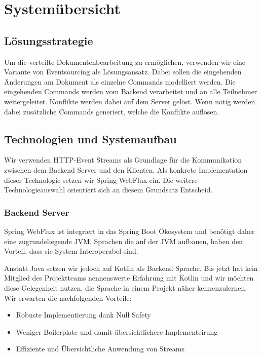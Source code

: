 \section{Systemübersicht}

\subsection{Lösungsstrategie}
Um die verteilte Dokumentenbearbeitung zu ermöglichen, verwenden wir eine Variante von Eventsourcing als Lösungsansatz.
Dabei sollen die eingehenden Änderungen am Dokument als einzelne Commands modelliert werden.
Die eingehenden Commands werden vom Backend verarbeitet und an alle Teilnehmer weitergeleitet.
Konflikte werden dabei auf dem Server gelöst.
Wenn nötig werden dabei zusätzliche Commands generiert, welche die Konflikte auflösen.

\subsection{Technologien und Systemaufbau}

Wir verwenden HTTP-Event Streams als Grundlage für die Kommunikation zwischen dem Backend Server und den Klienten.
Als konkrete Implementation dieser Technologie setzen wir Spring-WebFlux ein.
Die weitere Technologieauswahl orientiert sich an diesem Grundsatz Entscheid.

\subsubsection{Backend Server}
Spring WebFlux ist integriert in das Spring Boot Ökosystem und benötigt daher eine zugrundeliegende JVM\@.
Sprachen die auf der JVM aufbauen, haben den Vorteil, dass sie System Interoperabel sind.

Anstatt Java setzen wir jedoch auf Kotlin als Backend Sprache.
Bis jetzt hat kein Mitglied des Projektteams nennenswerte Erfahrung mit Kotlin und wir möchten diese Gelegenheit nutzen,
die Sprache in einem Projekt näher kennenzulernen.
Wir erwarten die nachfolgenden Vorteile:

\begin{itemize}
    \item Robuste Implementierung dank Null Safety
    \item Weniger Boilerplate und damit übersichtlichere Implementeirung
    \item Effiziente und Übersichtliche Anwendung von Streams
\end{itemize}


